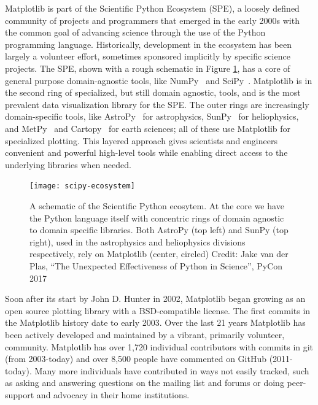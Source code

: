 \documentclass[12pt]{article}
\numberwithin{page}{section}
\begin{document}
Matplotlib is part of the Scientific Python Ecosystem (SPE), a loosely defined
community of projects and programmers that emerged in the early 2000s with the
common goal of advancing science
through the use of the Python programming language.
Historically, development in the ecosystem has been largely a volunteer
effort, sometimes sponsored implicitly by specific science projects.
The SPE, shown with a rough schematic in
Figure \ref{fig:ecosystem}, has a core of general purpose domain-agnostic
tools, like NumPy~\cite{Harris2020} and SciPy~\cite{Virtanen2020}.  Matplotlib
is in the second ring of specialized, but still domain agnostic, tools, and is
the most prevalent data visualization library for the SPE.  The outer rings are
increasingly domain-specific tools, like AstroPy~\cite{astropy:2013,
  astropy:2018} for astrophysics, SunPy~\cite{sunpy_community2020} for
heliophysics, and MetPy~\cite{metpy} and Cartopy~\cite{Cartopy} for earth
sciences; all of these use Matplotlib for specialized plotting.
This layered approach gives scientists and engineers
convenient and powerful high-level tools while enabling direct access to the
underlying libraries when needed.


\begin{figure}
  \texttt{[image: scipy-ecosystem]}
  \caption{\small A schematic of the Scientific Python ecosytem.  At the
    core we have the Python language itself with concentric rings of
    domain agnostic to domain specific libraries.  Both AstroPy (top
    left) and SunPy (top right), used in the astrophysics and
    heliophysics divisions respectively, rely on Matplotlib (center, circled)
    Credit: Jake van der Plas, ``The Unexpected Effectiveness of Python
    in Science'', PyCon 2017}
  \label{fig:ecosystem}
\end{figure}


Soon after its start by John D. Hunter in 2002, Matplotlib began growing as an
open source plotting library with a BSD-compatible license. The first commits
in the Matplotlib history date to early 2003.  Over the last 21 years
Matplotlib has been actively developed and maintained by a vibrant, primarily
volunteer, community.  Matplotlib has over 1,720 individual contributors with
commits in git (from 2003-today) and over 8,500 people have commented on GitHub
(2011-today).  Many more individuals have contributed in ways not easily
tracked, such as asking and answering questions on the mailing list and forums
or doing peer-support and advocacy in their home institutions.
\end{document}
